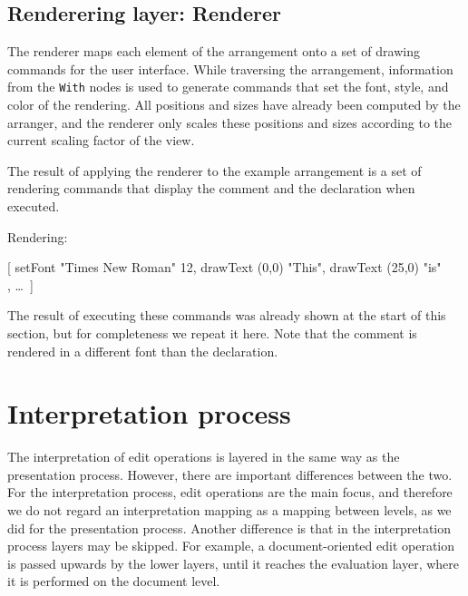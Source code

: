 %																
\subsection{Renderering layer: Renderer} \label{sect:renderer}

The renderer maps each element of the arrangement onto a set of drawing commands for the user interface. While traversing the arrangement, information from the \verb|With| nodes is used to generate commands that set the font, style, and color of the rendering. All positions and sizes have already been computed by the arranger, and the renderer only scales these positions and sizes according to the current scaling factor of the view. 


 The result of applying the renderer to the example arrangement is a set of rendering commands that display the comment and the declaration when executed.


Rendering:
\small \ttfamily

[ setFont "Times New Roman" 12,  drawText (0,0) "This", drawText (25,0) "is"\\
, \dots ~]
 
\rmfamily \normalsize
The result of executing these commands was already shown at the start of this section, but for completeness we repeat it here. Note that the comment is rendered in a different font than the declaration. 

\begin{center}
\end{center}

%																
%																
%																
\section{Interpretation process} \label{sect:intrProcess}

The interpretation of edit operations is layered in the same way as the presentation process. However, there are important differences between the two. For the interpretation process, edit operations are the main focus, and therefore we do not regard an interpretation mapping as a mapping between levels, as we did for the presentation process. \bc Another difference is that in the interpretation process layers may be skipped. For example, a document-oriented edit operation is passed upwards by the lower layers, until it reaches the evaluation layer, where it is performed on the document level. \ec



